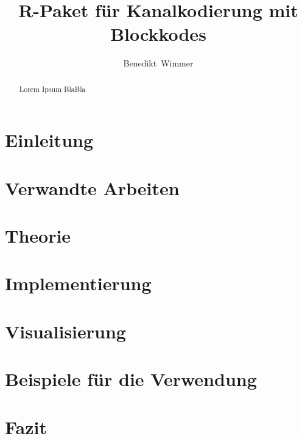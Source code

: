 \documentclass[germanthesis]{thesis-style}
\author{Benedikt~Wimmer}
\title{R-Paket für Kanalkodierung mit Blockkodes}
\begin{document}
\maketitle

\begin{abstract}
Lorem Ipsum BlaBla
\end{abstract}
%

\tableofcontents
{}

\chapter{Einleitung}
\label{chapter:introduction}



\chapter{Verwandte Arbeiten}
\label{chapter:related}

\chapter{Theorie}
\label{chapter:theory}


\chapter{Implementierung}
\label{chapter:implementation}


\chapter{Visualisierung}
\label{chapter:visualization}


\chapter{Beispiele für die Verwendung}
\label{chapter:examples}

\chapter{Fazit}
\label{chapter:conclusion}

\cleardoublepage%

\listofabbreviations
\clearpage

\listoffigures
\clearpage

\listoftables
\clearpage

\lstlistoflistings
\clearpage

\printbibliography
\end{document}
